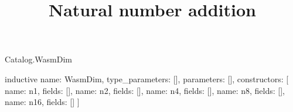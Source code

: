 \begin{lexlean}{Catalog.WasmDim}
\title{Natural number addition}
\begin{semanticmodule}
inductive{
  name: WasmDim,
  type_parameters: [],
  parameters: [],
  constructors: [
    {name: n1, fields: []},
    {name: n2, fields: []},
    {name: n4, fields: []},
    {name: n8, fields: []},
    {name: n16, fields: []}
  ]
}
\end{semanticmodule}
\end{lexlean}
